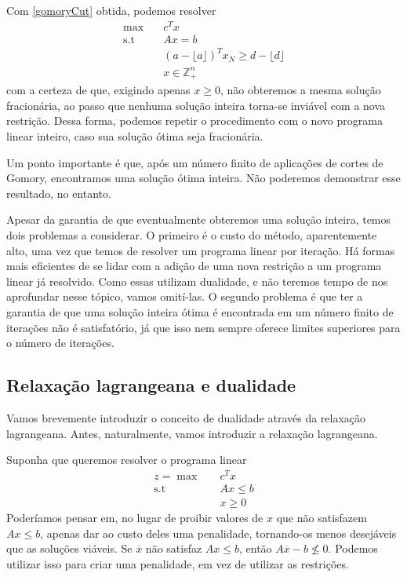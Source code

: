 \documentclass[]{article}
\numberwithin{equation}{section}
\begin{document}
Com \eqref{gomoryCut} obtida, podemos resolver
\begin{align}
\max        &\quad  c^Tx                                                    \\
\text{s.t}  &\quad  Ax = b                                                  \\
            &\quad  (a - \lfloor a \rfloor)^Tx_N \geq d - \lfloor d \rfloor \\
            &\quad  x \in \mathbb{Z}_+^n
\end{align}
com a certeza de que, exigindo apenas $x \geq 0$, não obteremos a mesma solução fracionária, ao passo
que nenhuma solução inteira torna-se inviável com a nova restrição.
Dessa forma, podemos repetir o procedimento com o novo programa linear inteiro, caso sua solução ótima
seja fracionária.

Um ponto importante é que, após um número finito de aplicações de cortes de Gomory, encontramos uma
solução ótima inteira.
Não poderemos demonstrar esse resultado, no entanto.

Apesar da garantia de que eventualmente obteremos uma solução inteira, temos dois problemas a
considerar.
O primeiro é o custo do método, aparentemente alto, uma vez que temos de resolver um programa linear
por iteração.
Há formas mais eficientes de se lidar com a adição de uma nova restrição a um programa linear já
resolvido.
Como essas utilizam dualidade, e não teremos tempo de nos aprofundar nesse tópico, vamos omití-las.
O segundo problema é que ter a garantia de que uma solução inteira ótima é encontrada em um número
finito de iterações não é satisfatório, já que isso nem sempre oferece limites superiores para o número
de iterações.

\subsection{Relaxação lagrangeana e dualidade}

Vamos brevemente introduzir o conceito de dualidade através da relaxação lagrangeana.
Antes, naturalmente, vamos introduzir a relaxação lagrangeana.

Suponha que queremos resolver o programa linear
\begin{align}
z =   \max        &\quad  c^Tx      \label{starLPC} \\
      \text{s.t}  &\quad  Ax \leq b                 \\
                  &\quad  x \geq 0  \label{endLPC}
\end{align}
Poderíamos pensar em, no lugar de proibir valores de $x$ que não satisfazem $Ax \leq b$,
apenas dar ao custo deles uma penalidade, tornando-os menos desejáveis que as soluções
viáveis.
Se $\overline{x}$ não satisfaz $Ax \leq b$, então $A\overline{x} - b \not\leq 0$.
Podemos utilizar isso para criar uma penalidade, em vez de utilizar as restrições.
\end{document}
